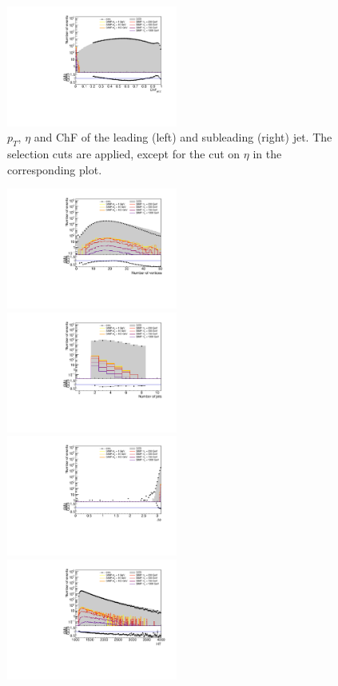 \begin{figure}[h!]
  \includegraphics[width=0.5\textwidth]{figures/jet2_chf_newtrigger}
  \caption{$p_T$, $\eta$ and ChF of the leading (left) and subleading (right) jet. The selection cuts are applied, except for the cut on $\eta$ in the corresponding plot.}
  \label{fig:event_selection}
\end{figure}

\begin{figure}[h]
  \centering
  \includegraphics[width=0.5\textwidth]{figures/nvtx_newtrigger}\hfill%
  \includegraphics[width=0.5\textwidth]{figures/njets_newtrigger}
  \includegraphics[width=0.5\textwidth]{figures/deltaphi}\hfill
  \includegraphics[width=0.5\textwidth]{figures/HT_newtrigger}

\end{figure}
